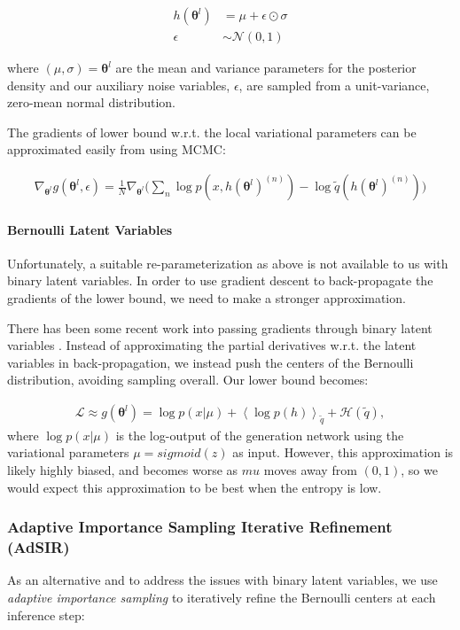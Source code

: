 \documentclass{article} %
\newcommand{\qexp}[1]{\left<#1\right>}
\newcommand{\vects}[1]{\boldsymbol{#1}}
\newcommand{\TT}[0]{\vects{\theta}}
\newcommand{\grad}[0]{\nabla}
\newcommand{\LL}[0]{\mathcal{L}}
\newcommand{\HH}[0]{\mathcal{H}}
\newcommand{\NN}[0]{\mathcal{N}}
\begin{document}
\begin{align}
h(\TT^l) &= \mu + \epsilon \odot \sigma \nonumber \\
\epsilon &\sim \NN(0, 1)
\end{align}

where $(\mu, \sigma) = \TT^l$ are the mean and variance parameters for the posterior density and our auxiliary noise variables, $\epsilon$, are sampled from a unit-variance, zero-mean normal distribution.

The gradients of lower bound w.r.t. the local variational parameters can be approximated easily from using MCMC:

\begin{align}
\grad_{\TT^l} g(\TT^l, \epsilon) = \frac{1}{N} \grad_{\TT^l} \bigg(\sum_n \log p(x, h(\TT^l)^{(n)}) - \log \tilde{q}(h(\TT^l)^{(n)})\bigg)
\end{align}

\paragraph{Bernoulli Latent Variables}
Unfortunately, a suitable re-parameterization as above is not available to us with binary latent variables. In order to use gradient descent to back-propagate the gradients of the lower bound, we need to make a stronger approximation. 

There has been some recent work into passing gradients through binary latent variables \citep{bengio2013estimating}. Instead of approximating the partial derivatives w.r.t. the latent variables in back-propagation, we instead push the centers of the Bernoulli distribution, avoiding sampling overall. Our lower bound becomes:

\begin{align}
	 \LL \approx g(\TT^l) = \log p(x | \mu) + \qexp{\log p(h)}_{\tilde{q}} + \HH(\tilde{q}),
\end{align}
where $\log p(x | \mu)$ is the log-output of the generation network using the variational parameters $\mu = sigmoid(z)$ as input. However, this approximation is likely highly biased, and becomes worse as $mu$ moves away from $(0, 1)$, so we would expect this approximation to be best when the entropy is low.

\subsubsection{Adaptive Importance Sampling Iterative Refinement (AdSIR)}
As an alternative and to address the issues with binary latent variables, we use \emph{adaptive importance sampling} \citep{karamchandani1989adaptive} to iteratively refine the Bernoulli centers at each inference step:
\end{document}
